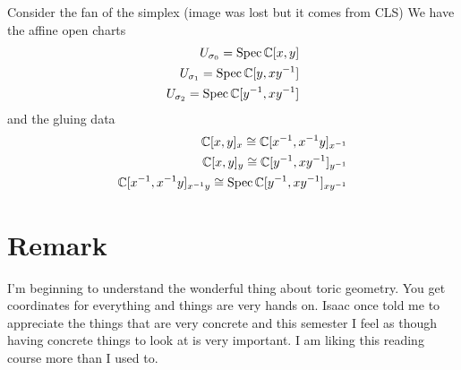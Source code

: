 \documentclass[12pt]{article}
\begin{document}
\begin{example}
    Consider the fan of the simplex (image was lost but it comes from CLS)
    We have the affine open charts 
    \begin{align*}
        U_{\sigma_0} = \operatorname{Spec} \mathbb{C}[x,y] \\
        U_{\sigma_1} = \operatorname{Spec} \mathbb{C}[y,{xy}^{-1}] \\
        U_{\sigma_2} = \operatorname{Spec} \mathbb{C}[{y}^{-1},x{y}^{-1}]
    \end{align*} and the gluing data 
    \begin{align*}
        \mathbb{C}[x,y]_{x} \cong \mathbb{C}[x^{-1},{x}^{-1}y]_{{x}^{-1}} \\
        \mathbb{C}[x,y]_{y} \cong \mathbb{C}[y^{-1},x{y}^{-1}]_{{y}^{-1}}\\
        \mathbb{C}[{x}^{-1},{x}^{-1}y]_{{x}^{-1}y} \cong  \operatorname{Spec} \mathbb{C}[{y}^{-1},x{y}^{-1}]_{x{y}^{-1}}
    \end{align*}
\end{example}

\section{Remark}
I'm beginning to understand the wonderful thing about toric geometry. You get coordinates for everything and things are very hands on.
Isaac once told me to appreciate the things that are very concrete and this semester I feel as though
having concrete things to look at is very important. I am liking this reading course more than I used to.
\end{document}
